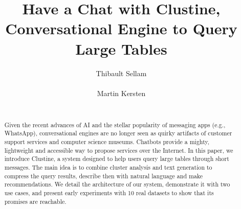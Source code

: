 \documentclass{sig-alternate}
\begin{document}
\title{Have a Chat with Clustine,\\Conversational Engine to Query Large Tables}

\author{
\alignauthor
Thibault Sellam\\
       \\
\alignauthor
Martin Kersten\\
       \\
}

\maketitle
\begin{abstract} 
Given the recent advances of AI and the stellar popularity of messaging apps
(e.g., WhatsApp), conversational engines are no longer seen as quirky artifacts
of customer support services and computer science museums. Chatbots provide a
mighty, lightweight and accessible way to propose services over the Internet.
In this paper, we introduce Clustine, a system designed to help users query
large tables through short messages. The main idea is to combine cluster
analysis and text generation to compress the query results, describe then with
natural language and make recommendations. We detail the architecture of our
system, demonstrate it with two use cases, and present early experiments with
10 real datasets to show that its promises are reachable.
\end{abstract}



\small


\end{document}
